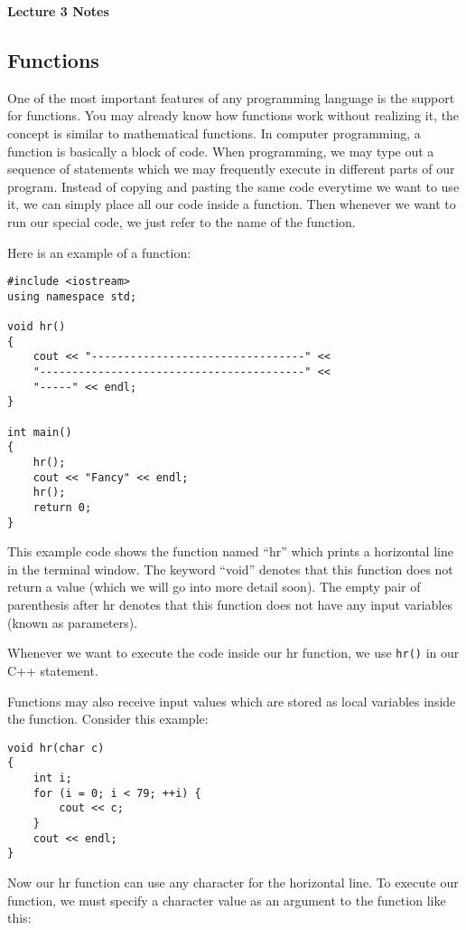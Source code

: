\documentclass[a4paper,12pt]{article}
\begin{document}
\lstset{frame=single,tabsize=4,basicstyle=\ttfamily}

{\centering \bf \Large
Lecture 3 Notes \\[\baselineskip]
}

\subsection*{Functions}

One of the most important features of any programming language is the support for functions. You may already know how functions work without realizing it, the concept is similar to mathematical functions. In computer programming, a function is basically a block of code. When programming, we may type out a sequence of statements which we may frequently execute in different parts of our program. Instead of copying and pasting the same code everytime we want to use it, we can simply place all our code inside a function. Then whenever we want to run our special code, we just refer to the name of the function. 

Here is an example of a function:
\begin{lstlisting}
#include <iostream>
using namespace std;

void hr()
{
	cout << "---------------------------------" <<
	"-----------------------------------------" <<
	"-----" << endl;
}

int main()
{
	hr();
	cout << "Fancy" << endl;
	hr();
	return 0;
}

\end{lstlisting}

This example code shows the function named ``hr'' which prints a horizontal line in the terminal window. The keyword ``void'' denotes that this function does not return a value (which we will go into more detail soon). The empty pair of parenthesis after hr denotes that this function does not have any input variables (known as parameters). 

Whenever we want to execute the code inside our hr function, we use \texttt{hr()} in our C++ statement. 

Functions may also receive input values which are stored as local variables inside the function. Consider this example:

\begin{lstlisting}
void hr(char c)
{
	int i;
	for (i = 0; i < 79; ++i) {
		cout << c;
	}
	cout << endl;
}
\end{lstlisting}

Now our hr function can use any character for the horizontal line. To execute our function, we must specify a character value as an argument to the function like this:
\end{document}
